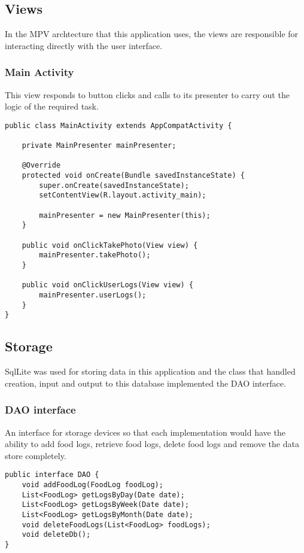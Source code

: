 \tocless\subsection{Views}
In the MPV archtecture that this application uses, the views are responsible for interacting directly with the user interface.

\tocless\subsubsection{Main Activity}
This view responds to button clicks and calls to its presenter to carry out the logic of the required task.
\begin{lstlisting}[style=Java]
public class MainActivity extends AppCompatActivity {

    private MainPresenter mainPresenter;

    @Override
    protected void onCreate(Bundle savedInstanceState) {
        super.onCreate(savedInstanceState);
        setContentView(R.layout.activity_main);

        mainPresenter = new MainPresenter(this);
    }

    public void onClickTakePhoto(View view) {
        mainPresenter.takePhoto();
    }

    public void onClickUserLogs(View view) {
        mainPresenter.userLogs();
    }
}
\end{lstlisting}

\tocless\subsection{Storage}
SqlLite was used for storing data in this application and the class that handled creation, input and output to this database implemented the DAO interface.

\tocless\subsubsection{DAO interface}
An interface for storage devices so that each implementation would have the ability to add food logs, retrieve food logs, delete food logs and remove the data store completely.
\begin{lstlisting}[style=Java]
public interface DAO {
    void addFoodLog(FoodLog foodLog);
    List<FoodLog> getLogsByDay(Date date);
    List<FoodLog> getLogsByWeek(Date date);
    List<FoodLog> getLogsByMonth(Date date);
    void deleteFoodLogs(List<FoodLog> foodLogs);
    void deleteDb();
}
\end{lstlisting}

